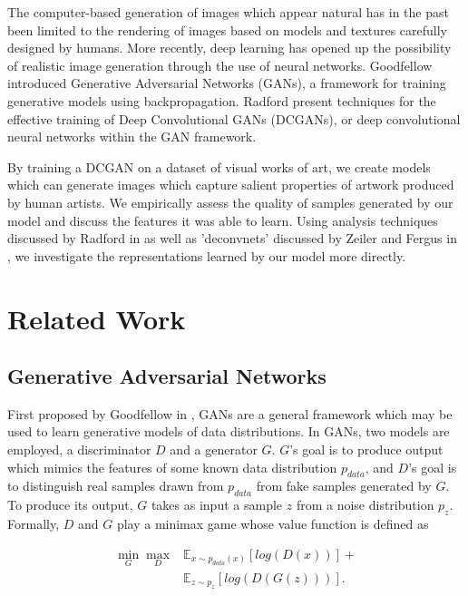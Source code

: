 \documentclass[10pt,twocolumn,letterpaper]{article}
\begin{document}
The computer-based generation of images which appear natural has in the past been limited to
the rendering of images based on models and textures carefully designed by humans. More recently,
deep learning has opened up the possibility of realistic image generation through the use of neural
networks. Goodfellow \etal \cite{goodfellow2014generative} introduced Generative Adversarial Networks
(GANs), a framework for training generative models using backpropagation. Radford \etal
\cite{radford2015unsupervised} present techniques for the effective training of Deep Convolutional
GANs (DCGANs), or deep convolutional neural networks within the GAN framework.

By training a DCGAN on a dataset of visual works of art, we create models which can generate images
which capture salient properties of artwork produced by human artists. We empirically assess the
quality of samples generated by our model and discuss the features it was able to learn.
Using analysis techniques discussed by Radford \etal in \cite{radford2015unsupervised} as well as 'deconvnets' discussed by Zeiler and Fergus in \cite{zeiler2014visualizing}, we investigate
the representations learned by our model more directly.

\section{Related Work}
\subsection{Generative Adversarial Networks}
First proposed by Goodfellow \etal in \cite{goodfellow2014generative}, GANs are a general
framework which may be used to learn generative models of data distributions. In GANs, two models
are employed, a discriminator $ D $ and a generator $ G $. $ G $'s goal is to produce output
which mimics the features of some known data distribution $ p_{data} $, and $ D $'s goal is to distinguish
real samples drawn from $ p_{data} $ from fake samples generated by $ G $. To produce its output, $ G $
takes as input a sample $ z $ from a noise distribution $ p_{z} $. Formally, $ D $ and $ G $ play
a minimax game whose value function is defined as

\begin{equation}
\begin{aligned}
\min_{G} \max_{D}  & \mathbb{E}_{x \sim p_{data}(x)}[log(D(x))]	+ \\
				   & \mathbb{E}_{z \sim p_{z}}[log(D(G(z)))].
\end{aligned}
\end{equation}
\end{document}
